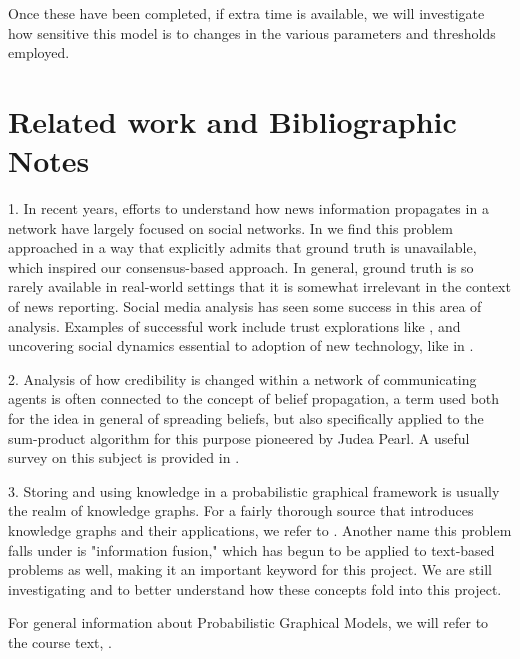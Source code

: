 \documentclass{amsart}
\theoremstyle{definition}
\theoremstyle{plain}
\numberwithin{equation}{section}
\begin{document}
\bigskip 

Once these have been completed, if extra time is available, we will
investigate how sensitive this model is to changes in the various parameters
and thresholds employed.

\section{Related work and Bibliographic Notes}

1. In recent years, efforts to understand how news information propagates in
a network have largely focused on social networks. In \cite%
{zafarani2015evaluation} we find this problem approached in a way that
explicitly admits that ground truth is unavailable, which inspired our
consensus-based approach. In general, ground truth is so rarely available in
real-world settings that it is somewhat irrelevant in the context of news
reporting. Social media analysis has seen some success in this area of
analysis. Examples of successful work include trust explorations like \cite%
{heuer2018trust}, and uncovering social dynamics essential to adoption of
new technology, like in \cite{kohler2001density}.

2. Analysis of how credibility is changed within a network of communicating
agents is often connected to the concept of belief propagation, a term used
both for the idea in general of spreading beliefs, but also specifically
applied to the sum-product algorithm for this purpose pioneered by Judea
Pearl. A useful survey on this subject is provided in \cite%
{yedidia2003understanding}.

3. Storing and using knowledge in a probabilistic graphical framework is
usually the realm of knowledge graphs. For a fairly thorough source that
introduces knowledge graphs and their applications, we refer to \cite%
{hogan2021knowledge}. Another name this problem falls under is "information
fusion," which has begun to be applied to text-based problems as well,
making it an important keyword for this project.  We are still investigating 
\cite{levchuk2015probabilistic} and \cite{radev2000common} to better
understand how these concepts fold into this project.

For general information about Probabilistic Graphical Models, we will refer
to the course text, \cite{koller2009probabilistic}.



\end{document}

